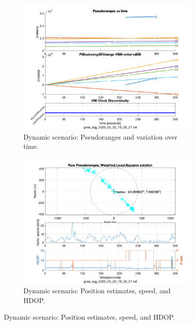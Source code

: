             \begin{figure}[h!]
                \centering
                \begin{subfigure}{0.23\textwidth}
                    \centering
                    \includegraphics[width=\textwidth]{images/Tram_15_trip_Castello_to_Pescatore/filtered/Samsung_A51_Tram_15_trip_Castello_to_Pescatore_fig1.png}
                    \caption{Dynamic scenario: Pseudoranges and variation over time.}
                    \label{fig:dynamic_pr}
                \end{subfigure}
                \hfill
                \begin{subfigure}{0.23\textwidth}
                    \centering
                    \includegraphics[width=\textwidth]{images/Tram_15_trip_Castello_to_Pescatore/filtered/Samsung_A51_Tram_15_trip_Castello_to_Pescatore_fig4.png}
                    \caption{Dynamic scenario: Position estimates, speed, and HDOP.}
                    \label{fig:dynamic_pos}
                \end{subfigure}
                \vspace{0.35cm}
                \label{fig:gnss_comparison}
            \end{figure}

